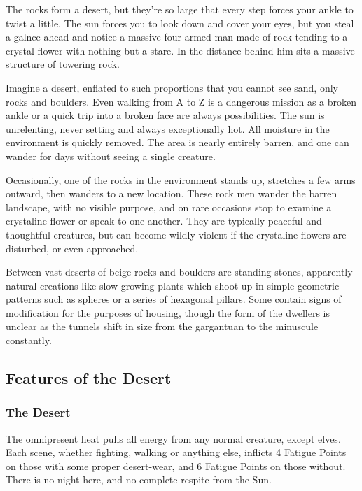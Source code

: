 \begin{multicols}{2}

\begin{boxtext}
	The rocks form a desert, but they're so large that every step forces your ankle to twist a little.  The sun forces you to look down and cover your eyes, but you steal a galnce ahead and notice a massive four-armed man made of rock tending to a crystal flower with nothing but a stare.  In the distance behind him sits a massive structure of towering rock.
\end{boxtext}

Imagine a desert, enflated to such proportions that you cannot see sand, only rocks and boulders.
Even walking from A to Z is a dangerous mission as a broken ankle or a quick trip into a broken face are always possibilities.  The sun is unrelenting, never setting and always exceptionally hot.  All moisture in the environment is quickly removed.  The area is nearly entirely barren, and one can wander for days without seeing a single creature.

Occasionally, one of the rocks in the environment stands up, stretches a few arms outward, then wanders to a new location.  These rock men wander the barren landscape, with no visible purpose, and on rare occasions stop to examine a crystaline flower or speak to one another.  They are typically peaceful and thoughtful creatures, but can become wildly violent if the crystaline flowers are disturbed, or even approached.

Between vast deserts of beige rocks and boulders are standing stones, apparently natural creations like slow-growing plants which shoot up in simple geometric patterns such as spheres or a series of hexagonal pillars.  Some contain signs of modification for the purposes of housing, though the form of the dwellers is unclear as the tunnels shift in size from the gargantuan to the minuscule constantly.

\subsection{Features of the Desert}
\subsubsection{The Desert}
The omnipresent heat pulls all energy from any normal creature, except elves.  Each scene, whether fighting, walking or anything else, inflicts 4 Fatigue Points on those with some proper desert-wear, and 6 Fatigue Points on those without. There is no night here, and no complete respite from the Sun.


\end{multicols}
